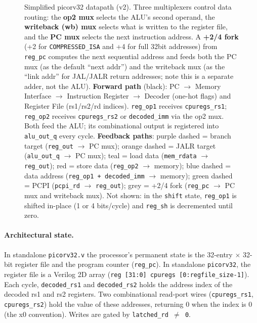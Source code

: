 \documentclass[9pt, a4paper]{extarticle}
\begin{document}
\begin{figure}[htbp]
\begin{tikzpicture}
    \end{tikzpicture}
    \caption{Simplified picorv32 datapath (v2). Three multiplexers control data routing: the \textbf{op2 mux} selects the ALU's second operand, the \textbf{writeback (wb) mux} selects what is written to the register file, and the \textbf{PC mux} selects the next instruction address. A \textbf{+2/4 fork} (+2 for \texttt{COMPRESSED\_ISA} and +4 for full 32bit addresses) from \texttt{reg\_pc} computes the next sequential address and feeds both the PC mux (as the default ``next addr'') and the writeback mux (as the ``link addr'' for JAL/JALR return addresses; note this is a separate adder, not the ALU).
    \textbf{Forward path} (black): PC $\to$ Memory Interface $\to$ Instruction Register $\to$ Decoder (one-hot flags) and Register File (rs1/rs2/rd indices). \texttt{reg\_op1} receives \texttt{cpuregs\_rs1}; \texttt{reg\_op2} receives \texttt{cpuregs\_rs2} or \texttt{decoded\_imm} via the op2 mux. Both feed the ALU; its combinational output is registered into \texttt{alu\_out\_q} every cycle.
    \textbf{Feedback paths}: \textcolor{purple!60}{purple dashed} = branch target (\texttt{reg\_out} $\to$ PC mux); \textcolor{orange!70!black}{orange dashed} = JALR target (\texttt{alu\_out\_q} $\to$ PC mux); \textcolor{cyan!60!black}{teal} = load data (\texttt{mem\_rdata} $\to$ \texttt{reg\_out}); \textcolor{red!45!black}{red} = store data (\texttt{reg\_op2} $\to$ memory); \textcolor{blue!80}{blue dashed} = data address (\texttt{reg\_op1 + decoded\_imm} $\to$ memory); \textcolor{green!50!black}{green dashed} = PCPI (\texttt{pcpi\_rd} $\to$ \texttt{reg\_out}); grey = +2/4 fork (\texttt{reg\_pc} $\to$ PC mux and writeback mux). Not shown: in the \texttt{shift} state, \texttt{reg\_op1} is shifted in-place (1 or 4 bits/cycle) and \texttt{reg\_sh} is decremented until zero.}
    \label{fig:picorv32-datapath}
\end{figure}

\paragraph{Architectural state.} In standalone \texttt{picorv32.v} the processor's permanent state is the 32-entry $\times$ 32-bit register file and the program counter (\texttt{reg\_pc}). In standalone \texttt{picorv32}, the register file is a Verilog 2D array (\texttt{reg [31:0] cpuregs [0:regfile\_size-1]}). Each cycle, \texttt{decoded\_rs1} and \texttt{decoded\_rs2} holds the address index of the decoded rs1 and rs2 registers. Two combinational read-port wires (\texttt{cpuregs\_rs1}, \texttt{cpuregs\_rs2}) hold the value of these addresses, returning 0 when the index is 0 (the x0 convention). Writes are gated by \texttt{latched\_rd $\neq$ 0}.
\end{document}

